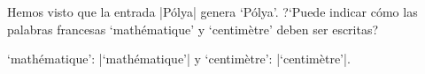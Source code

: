  


\bigskip

\enunciadoS Hemos visto que la entrada |P\'olya| genera `P\'olya'.
?`Puede indicar c\'omo las palabras francesas `math\'ematique' y `centim\`etre'
deben ser escritas?

\bigskip

\respuestaS `math\'ematique': |`math\'ematique'| y `centim\`etre':
|`centim\`etre'|.

\bye